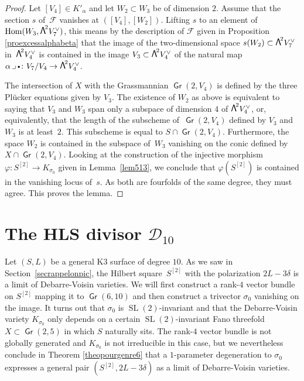 \documentclass[JEP,XML,SOM,Unicode, NoEqCountersInSection,NoFloatCountersInSection]{cedram}
\let\mathcal\mathscr
\newcommand{\cbullet}{{\raisebox{1pt}{$\scriptscriptstyle\bullet$}}}
\theoremstyle{definition}
\newcommand\cD{\mathcal{D}}
\newcommand\cF{\mathcal{F}}
\DeclareMathOperator{\Gr}{\mathsf{Gr}}
\let\phi\varphi
\let\Ld L
\DeclareMathOperator{\Hom}{Hom}
\DeclareMathOperator{\SL}{SL}
\newcommand\bw[1]{{\hbox{\large$\mathsf{\Lambda}$}^{\!#1}}}
\newcommand\hilbS{S^{[2]}}
\begin{document}
\begin{proof} Let $[V_4]\in K'_\alpha$ and let $W_2\subset W_3$ be of dimension $2$.
Assume that the section $s$ of~$\cF$ vanishes at $([V_4],[W_2])$. Lifting $s$ to an element of $\Hom (W_3,\bw2V_7^\vee )$, this means by
the description of $\cF$ given in Proposition \ref{proexcessalphabeta} that the image of the two-dimensional space
$s(W_2)\subset \bw2V_7^\vee$ in~$\bw2V_4^\vee$ is contained in the image $V_3\subset \bw2V_4^\vee$ of
the natural map $\alpha\,\lrcorner\,\cbullet\colon V_7/V_4\to \bw2V_4^\vee$.

The intersection of $X$ with the Grassmannian $\Gr(2,V_4)$ is defined
by the three Plücker equations given by $V_3$. The existence of $W_2$ as above is equivalent to saying that $V_3$ and $W_3$ span only a subspace of dimension $4$ of $\bw2V_4^\vee$, or, equivalently, that the length of the subscheme of~$\Gr(2,V_4)$ defined by $V_3$ and $W_3$ is at least~$2$. This subscheme is equal to $S\cap \Gr(2,V_4)$. Furthermore, the space $W_2$ is contained in the subspace of~$W_3$ vanishing on the conic defined by $X\cap \Gr(2,V_4)$.
Looking at the construction of the injective morphism $\phi\colon \hilbS\to K_{\sigma_0}$ given in Lemma~\ref{lem513}, we conclude that $\phi(\hilbS)$ is contained in
the vanishing locus of~$s$. As both are fourfolds of the same degree, they must agree.
This proves the lemma.
\end{proof}

\section{The HLS divisor \texorpdfstring{$\cD_{10}$}{D10}}
\label{secpf6}

Let $(S,L)$ be a general K3 surface of degree $10$.
As we saw in Section~\ref{secrappelonpic}, the Hilbert square~$\hilbS$ with the polarization $2\Ld-3\delta$ is a limit of Debarre-Voisin varieties. We will first construct a
\mbox{rank-$4$} vector bundle on $\hilbS$ mapping it to $\Gr(6,10)$ and then construct a trivector
$\sigma_0$ vanishing on the image. It turns out that $\sigma_0$ is $\SL(2)$-invariant
and that the Debarre-Voisin variety $K_{\sigma_0}$ only depends on a certain
$\SL(2)$-invariant Fano threefold
$X\subset\Gr(2,5)$ in which $S$ naturally sits. The rank-$4$ vector bundle is not globally
generated and $K_{\sigma_0}$ is not irreducible in this case, but we nevertheless conclude in Theorem \ref{theopourgenre6} that a $1$-parameter degeneration to $\sigma_0$
expresses a general pair $(\hilbS,2\Ld-3\delta)$ as a limit of Debarre-Voisin varieties.
\end{document}
